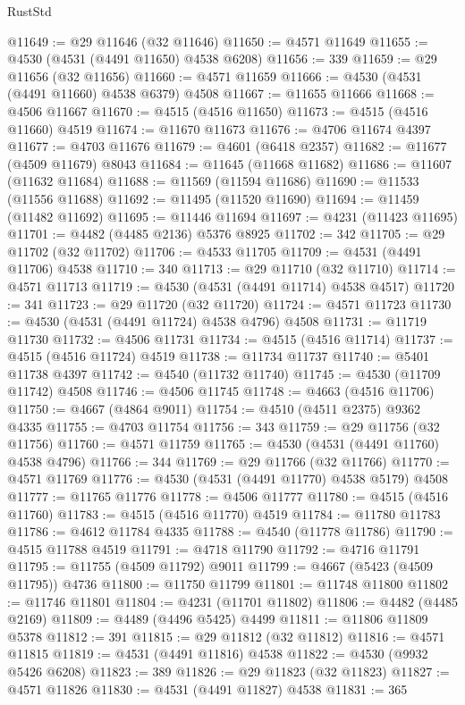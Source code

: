 \begin{lexlean}{RustStd}
\begin{coremodule}
{\begin{coremodule}
{{{{{{{{{{{{{{{{{{{{{{{{{{{{{{{{{{{{{{{{{{{{{{{{{{{{{{{@11649 := @29 @11646 (@32 @11646)
@11650 := @4571 @11649
@11655 := @4530 (@4531 (@4491 @11650) @4538 @6208)
@11656 := 339
@11659 := @29 @11656 (@32 @11656)
@11660 := @4571 @11659
@11666 := @4530 (@4531 (@4491 @11660) @4538 @6379) @4508
@11667 := @11655 @11666
@11668 := @4506 @11667
@11670 := @4515 (@4516 @11650)
@11673 := @4515 (@4516 @11660) @4519
@11674 := @11670 @11673
@11676 := @4706 @11674 @4397
@11677 := @4703 @11676
@11679 := @4601 (@6418 @2357)
@11682 := @11677 (@4509 @11679) @8043
@11684 := @11645 (@11668 @11682)
@11686 := @11607 (@11632 @11684)
@11688 := @11569 (@11594 @11686)
@11690 := @11533 (@11556 @11688)
@11692 := @11495 (@11520 @11690)
@11694 := @11459 (@11482 @11692)
@11695 := @11446 @11694
@11697 := @4231 (@11423 @11695)
@11701 := @4482 (@4485 @2136) @5376 @8925
@11702 := 342
@11705 := @29 @11702 (@32 @11702)
@11706 := @4533 @11705
@11709 := @4531 (@4491 @11706) @4538
@11710 := 340
@11713 := @29 @11710 (@32 @11710)
@11714 := @4571 @11713
@11719 := @4530 (@4531 (@4491 @11714) @4538 @4517)
@11720 := 341
@11723 := @29 @11720 (@32 @11720)
@11724 := @4571 @11723
@11730 := @4530 (@4531 (@4491 @11724) @4538 @4796) @4508
@11731 := @11719 @11730
@11732 := @4506 @11731
@11734 := @4515 (@4516 @11714)
@11737 := @4515 (@4516 @11724) @4519
@11738 := @11734 @11737
@11740 := @5401 @11738 @4397
@11742 := @4540 (@11732 @11740)
@11745 := @4530 (@11709 @11742) @4508
@11746 := @4506 @11745
@11748 := @4663 (@4516 @11706)
@11750 := @4667 (@4864 @9011)
@11754 := @4510 (@4511 @2375) @9362 @4335
@11755 := @4703 @11754
@11756 := 343
@11759 := @29 @11756 (@32 @11756)
@11760 := @4571 @11759
@11765 := @4530 (@4531 (@4491 @11760) @4538 @4796)
@11766 := 344
@11769 := @29 @11766 (@32 @11766)
@11770 := @4571 @11769
@11776 := @4530 (@4531 (@4491 @11770) @4538 @5179) @4508
@11777 := @11765 @11776
@11778 := @4506 @11777
@11780 := @4515 (@4516 @11760)
@11783 := @4515 (@4516 @11770) @4519
@11784 := @11780 @11783
@11786 := @4612 @11784 @4335
@11788 := @4540 (@11778 @11786)
@11790 := @4515 @11788 @4519
@11791 := @4718 @11790
@11792 := @4716 @11791
@11795 := @11755 (@4509 @11792) @9011
@11799 := @4667 (@5423 (@4509 @11795)) @4736
@11800 := @11750 @11799
@11801 := @11748 @11800
@11802 := @11746 @11801
@11804 := @4231 (@11701 @11802)
@11806 := @4482 (@4485 @2169)
@11809 := @4489 (@4496 @5425) @4499
@11811 := @11806 @11809 @5378
@11812 := 391
@11815 := @29 @11812 (@32 @11812)
@11816 := @4571 @11815
@11819 := @4531 (@4491 @11816) @4538
@11822 := @4530 (@9932 @5426 @6208)
@11823 := 389
@11826 := @29 @11823 (@32 @11823)
@11827 := @4571 @11826
@11830 := @4531 (@4491 @11827) @4538
@11831 := 365
}}}}}}}}}}}}}}}}}}}}}}}}}}}}}}}}}}}}}}}}}}}}}}}}}}}}}}}
\end{coremodule}}
\end{coremodule}
\end{lexlean}
